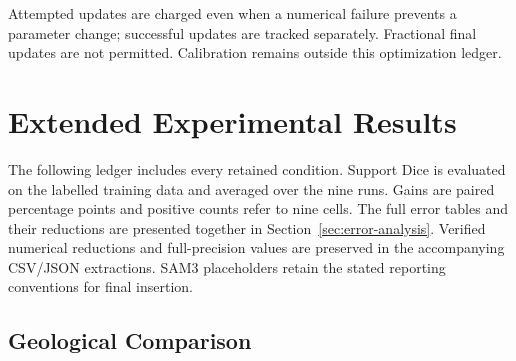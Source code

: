 \documentclass[12pt,a4paper]{article}
\begin{document}
Attempted updates are charged even when a numerical failure prevents
a parameter change; successful updates are tracked separately.
Fractional final updates are not permitted. Calibration remains
outside this optimization ledger.

\clearpage

\section{Extended Experimental Results}
\label{sec:extended-results}

The following ledger includes every retained condition. Support Dice is
evaluated on the labelled training data and averaged over the nine runs. Gains
are paired percentage points and positive counts refer to nine cells.
The full error tables and their reductions are presented together in
Section~\ref{sec:error-analysis}. Verified numerical reductions and
full-precision values are preserved in the accompanying CSV/JSON
extractions. SAM3 placeholders retain the stated reporting conventions
for final insertion.

\subsection{Geological Comparison}
\end{document}
